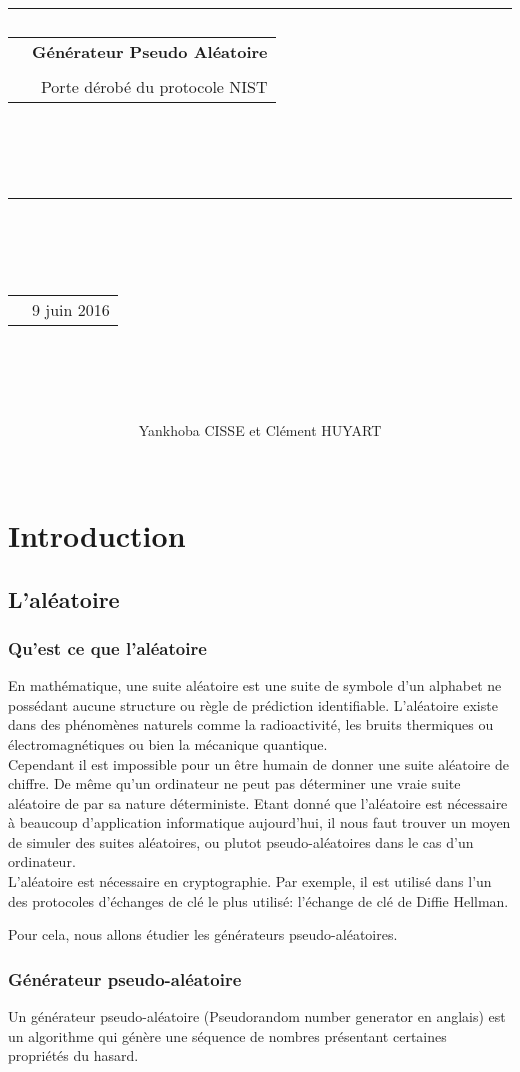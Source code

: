 \documentclass[a4paper,11pt]{report}
\title{
{\rule{\larg}{1mm}}\vspace{7mm}
\begin{tabular}{p{1cm} r}
   & {\Huge {\bf G\'en\'erateur Pseudo Al\'eatoire}} \\
   & \\
   & {\huge Porte d\'erob\'e du protocole NIST}
\end{tabular}\\
\vspace{2mm}
{\rule{\larg}{1mm}}
\vspace{2mm} \\
\begin{tabular}{p{11cm} r}
   & {\large  9 juin 2016}
\end{tabular}\\
\vspace{5.5cm}
}
\author{\begin{tabular}{p{13.7cm}}
Yankhoba CISSE et Cl\'ement HUYART
\end{tabular}\\
\hline }
\date{}
\begin{document}
\maketitle

\tableofcontents
\chapter{Introduction}

\section{L'al\'eatoire}
	\subsection{Qu'est ce que l'al\'eatoire}
	En math\'ematique, une suite al\'eatoire est une suite de symbole d'un alphabet ne poss\'edant %
	aucune structure ou r\`egle de pr\'ediction identifiable. L'al\'eatoire existe dans des %
	ph\'enom\`enes naturels comme la radioactivit\'e, les bruits thermiques ou %
	\'electromagn\'etiques ou bien la m\'ecanique quantique. \\
	
	
	Cependant il est impossible pour un \^etre humain de donner une suite al\'eatoire de chiffre. %
	De m\^eme qu'un ordinateur ne peut pas d\'eterminer une vraie suite al\'eatoire de par sa %
	nature d\'eterministe. Etant donn\'e que l'al\'eatoire est n\'ecessaire \`a beaucoup %
	d'application informatique aujourd'hui, il nous faut trouver un moyen de simuler des %
	suites al\'eatoires, ou plutot pseudo-al\'eatoires dans le cas d'un ordinateur. \\
	
	L'al\'eatoire est n\'ecessaire en cryptographie. Par exemple, il est utilis\'e dans l'un des %
	protocoles d'\'echanges de cl\'e le plus utilis\'e: l'\'echange de cl\'e de Diffie Hellman.
	
	Pour cela, nous allons \'etudier les g\'en\'erateurs pseudo-al\'eatoires.
	
	\subsection{G\'en\'erateur pseudo-al\'eatoire}
		Un g\'en\'erateur pseudo-al\'eatoire (Pseudorandom number generator en anglais) est un %
		algorithme qui g\'en\`ere une s\'equence de nombres pr\'esentant certaines propri\'et\'es du hasard.\\
		
\end{document}
